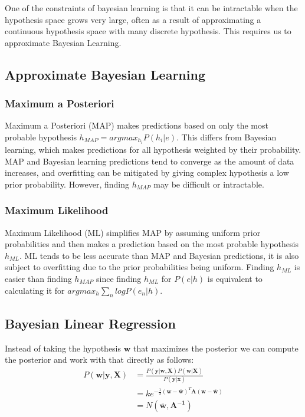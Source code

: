 \documentclass[12pt]{article}
\begin{document}
    One of the constraints of bayesian learning is that it can be intractable when the hypothesis space grows very large, often as a result of approximating a continuous hypothesis space with many discrete hypothesis. This requires us to approximate 
    Bayesian Learning.

    \subsection{Approximate Bayesian Learning}
    \subsubsection{Maximum a Posteriori}
        Maximum a Posteriori (MAP) makes predictions based on only the most probable hypothesis $h_{MAP} = argmax_{h_i}P(h_i | e)$. This differs from Bayesian learning, which makes predictions for all hypothesis weighted by their probability. 
        MAP and Bayesian learning predictions tend to converge as the amount of data increases, and overfitting can be mitigated by giving complex hypothesis a low prior probability. However, finding $h_{MAP}$ may be difficult or intractable.

    \subsubsection{Maximum Likelihood}
        Maximum Likelihood (ML) simplifies MAP by assuming uniform prior probabilities and then makes a prediction based on the most probable hypothesis $h_{ML}$. ML tends to be less accurate than MAP and Bayesian predictions, it is also subject to overfitting
        due to the prior probabilities being uniform. Finding $h_{ML}$ is easier than finding $h_{MAP}$ since finding $h_{ML}$ for $P(e|h)$ is equivalent to calculating it for $argmax_h \sum_n logP(e_n |h)$.

    \subsection{Bayesian Linear Regression}
        Instead of taking the hypothesis $\boldsymbol{w}$ that maximizes the posterior we can compute the posterior and work with that directly as follows:
        \begin{align*}
            P(\boldsymbol{w}|\boldsymbol{y}, \boldsymbol{X}) &= \frac{P(\boldsymbol{y}|\boldsymbol{w}, \boldsymbol{X})P(\boldsymbol{w}|\boldsymbol{X})}{P(\boldsymbol{y}|\boldsymbol{x})} \\
            &= ke^{-\frac{1}{2}(\boldsymbol{w}-\overline{\boldsymbol{w}})^T\boldsymbol{A}(\boldsymbol{w}-\overline{\boldsymbol{w}})} \\
            &= N(\overline{\boldsymbol{w}}, \boldsymbol{A^{-1}})
        \end{align*}
\end{document}
